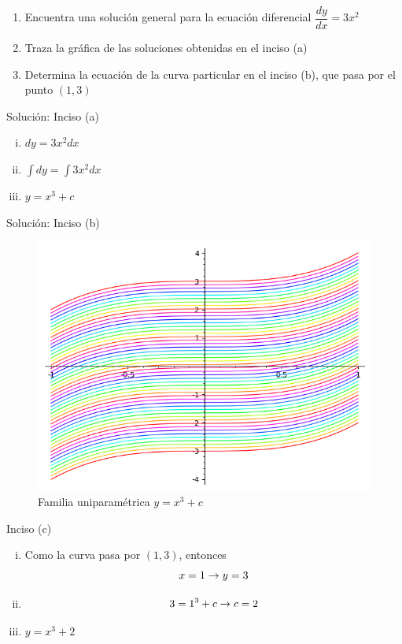 \begin{enumerate}
	\item  Encuentra una solución general para la ecuación diferencial $\dfrac{dy}{dx}=3x^{2}$
	\item Traza la gráfica de las soluciones obtenidas en el inciso (a)
	\item Determina la ecuación de la curva particular en el inciso (b), que pasa por el punto $\left( 1,3 \right)$
\end{enumerate}


{Solución: Inciso (a)}
\begin{enumerate}[(i)]
	\item $dy=3x^{2}dx$
	\item $\displaystyle
	\int dy = \int 3x^{2}dx$

	\item $y=x^{3}+c$
\end{enumerate}


{Solución: Inciso (b)}
\begin{figure}
	\centering
	\includegraphics[width=\textwidth,keepaspectratio=true]{./edo/solved_problem_02-08.png}
	\caption{Familia uniparamétrica $y=x^3+c$}
	\label{fig:solved_problem_02-08}
\end{figure}



{Inciso (c)}
\begin{enumerate}[(i)]
	\item Como la curva pasa por $(1,3)$, entonces
	$$x=1 \rightarrow y =3$$
	\item $$
	3 = 1^{3}+c \rightarrow c=2
	$$
	\item $y=x^{3}+2$
\end{enumerate}



